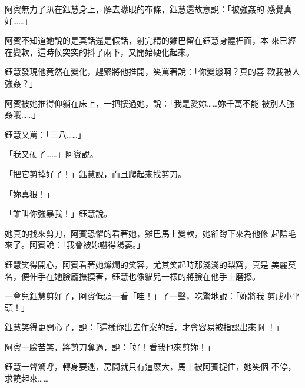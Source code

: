 阿賓無力了趴在鈺慧身上，解去矇眼的布條，鈺慧還故意說：「被強姦的
感覺真好……」

阿賓不知道她說的是真話還是假話，射完精的雞巴留在鈺慧身體裡面，本
來已經在變軟，這時候突突的抖了兩下，又開始硬化起來。

鈺慧發現他竟然在變化，趕緊將他推開，笑罵著說：「你變態啊？真的喜
歡我被人強姦？」

阿賓被她推得仰躺在床上，一把摟過她，說：「我是愛妳……妳千萬不能
被別人強姦哦……」

鈺慧又罵：「三八……」

「我又硬了……」阿賓說。

「把它剪掉好了！」鈺慧說，而且爬起來找剪刀。

「妳真狠！」

「誰叫你強暴我！」鈺慧說。

她真的找來剪刀，阿賓恐懼的看著她，雞巴馬上變軟，她卻蹲下來為他修
起陰毛來了。阿賓說：「我會被妳嚇得陽萎。」

鈺慧笑得開心，阿賓看著她燦爛的笑容，尤其笑起時那淺淺的梨窩，真是
美麗莫名，便伸手在她臉龐撫摸著，鈺慧也像貓兒一樣的將臉在他手上磨擦。

一會兒鈺慧剪好了，阿賓低頭一看「哇！」了一聲，吃驚地說：「妳將我
剪成小平頭！」

鈺慧笑得更開心了，說：「這樣你出去作案的話，才會容易被指認出來啊
！」

阿賓一臉苦笑，將剪刀奪過，說：「好！看我也來剪妳！」

鈺慧一聲驚呼，轉身要逃，房間就只有這麼大，馬上被阿賓捉住，她笑個
不停，求饒起來……










